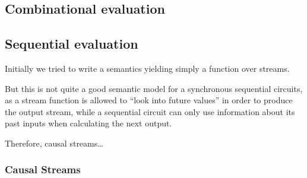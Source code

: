         \subsection{Combinational evaluation}
        \label{subsec:combinational-eval}

        \subsection{Sequential evaluation}
        \label{subsec:sequential-eval}
            Initially we tried to write a semantics yielding simply a function over streams.

            But this is not quite a good semantic model for a synchronous sequential circuits,
            as a stream function is allowed to ``look into future values'' in order to produce
            the output stream, while a sequential circuit can only use information about its past inputs
            when calculating the next output.

            Therefore, causal streams\ldots

            \subsubsection{Causal Streams}
